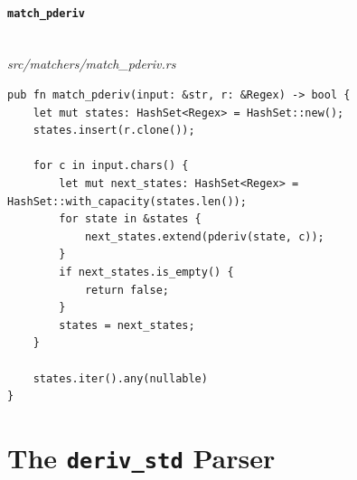 \paragraph{\texttt{match\_pderiv}}\ \\[-0.4em]
\textit{\small src/matchers/match\_pderiv.rs}
{\scriptsize\begin{verbatim}
pub fn match_pderiv(input: &str, r: &Regex) -> bool {
    let mut states: HashSet<Regex> = HashSet::new();
    states.insert(r.clone());

    for c in input.chars() {
        let mut next_states: HashSet<Regex> = HashSet::with_capacity(states.len());
        for state in &states {
            next_states.extend(pderiv(state, c));
        }
        if next_states.is_empty() {
            return false;
        }
        states = next_states;
    }

    states.iter().any(nullable)
}
\end{verbatim}}

\section{The \texttt{deriv\_std} Parser}
\label{app:code-deriv-std}

